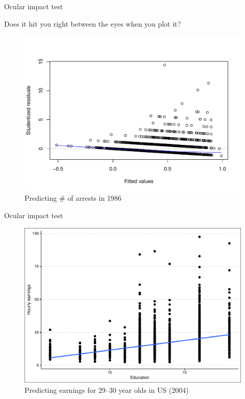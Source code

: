 \documentclass[12pt,english,pdf,xcolor=dvipsnames,aspectratio=169,handout]{beamer}\usepackage[]{graphicx}\usepackage[]{xcolor}
\begin{document}
\begin{frame}{Ocular impact test}

Does it hit you right between the eyes when you plot it?



\begin{figure}
\centering
\includegraphics[scale=0.45]{../04-graphs/02-01}
\caption{Predicting \# of arrests in 1986}
\end{figure}

\end{frame}


\begin{frame}{Ocular impact test}



\begin{figure}
\centering
\includegraphics[scale=0.5]{../04-graphs/02-02}
\caption{Predicting earnings for 29--30 year olds in US (2004)}
\end{figure}

\end{frame}
\end{document}
